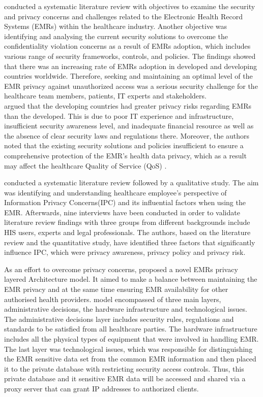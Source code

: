 \citet{Mahfuth2016} conducted a systematic literature review with objectives to examine the security and privacy concerns and challenges related to the Electronic Health Record Systems (EMRs) within the healthcare industry. Another objective was identifying and analysing the current security solutions to overcome the confidentiality violation concerns as a result of EMRs adoption, which includes various range of security frameworks, controls, and policies. The findings showed that there was an increasing rate of EMRs adoption in developed and developing countries worldwide. Therefore, seeking and maintaining an optimal level of the EMR privacy against unauthorized access was a serious security challenge for the healthcare team members, patients, IT experts and stakeholders.\\
\citet{Mahfuth2016} argued that the developing countries had greater privacy risks regarding EMRs than the developed. This is due to poor IT experience and infrastructure, insufficient security awareness level, and inadequate financial resource as well as the absence of clear security laws and regulations there. Moreover, the authors noted that the existing security solutions and policies insufficient to ensure a comprehensive protection of the EMR’s health data privacy, which as a result may affect the healthcare Quality of Service (QoS) \cite{Mahfuth2016}.

\citet{Rahim2016} conducted a systematic literature review followed by a qualitative study. The aim was identifying and understanding healthcare employee’s perspective of Information Privacy Concerns(IPC) and its influential factors when using the EMR. Afterwards, nine interviews have been conducted in order to validate literature review findings with three groups from different backgrounds include HIS users, experts and legal professionals. The authors, based on the literature review and the quantitative study, have identified three factors that significantly influence IPC, which were privacy awareness, privacy policy and privacy risk. 

As an effort to overcome privacy concerns, \citet{Bensefia2014} proposed a novel EMRs privacy layered Architecture model. It aimed to make a balance between maintaining the EMR privacy and at the same time ensuring EMR availability for other authorised health providers.\citet{Bensefia2014} model encompassed of three main layers, administrative decisions, the hardware infrastructure and technological issues. The administrative decisions layer includes security rules, regulations and standards to be satisfied from all healthcare parties. The hardware infrastructure includes all the physical types of equipment that were involved in handling EMR. The last layer was technological issues, which was responsible for distinguishing the EMR sensitive data set from the common EMR information and then placed it to the private database with restricting security access controls. Thus, this private database and it sensitive EMR data will be accessed and shared via a proxy server that can grant IP addresses to authorized clients.

